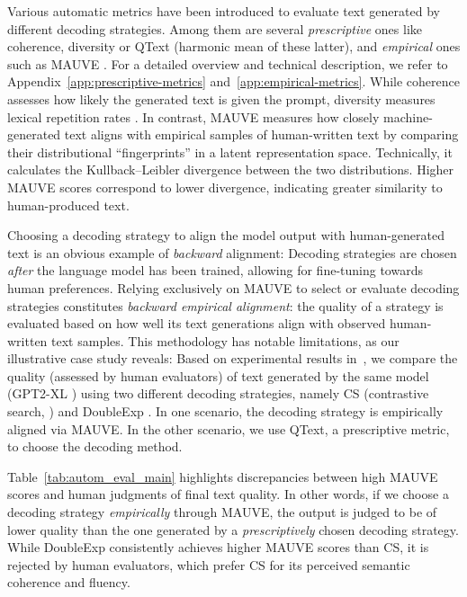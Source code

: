 \documentclass{article}
\theoremstyle{plain}
\theoremstyle{definition}
\theoremstyle{remark}
\begin{document}
Various automatic metrics have been introduced to evaluate text generated by different decoding strategies. Among them are several \textit{prescriptive} ones like coherence, diversity or QText (harmonic mean of these latter), and \textit{empirical} ones such as MAUVE \cite{pillutla2021mauvemeasuringgapneural}. For a detailed overview and technical description, we refer to Appendix~\ref{app:prescriptive-metrics} and~\ref{app:empirical-metrics}. While coherence assesses how likely the generated text is given the prompt, diversity measures lexical repetition rates \cite{su2022empiricalstudycontrastivesearch}.  
In contrast, MAUVE measures how closely machine-generated text aligns with empirical samples of human-written text by comparing their distributional “fingerprints” in a latent representation space. Technically, it calculates the Kullback–Leibler divergence between the two distributions. Higher MAUVE scores correspond to lower divergence, indicating greater similarity to human-produced text.

Choosing a decoding strategy to align the model output with human-generated text is an obvious example of \textit{backward} alignment: Decoding strategies are chosen \textit{after} the language model has been trained, allowing for fine-tuning towards human preferences. Relying exclusively on MAUVE to select or evaluate decoding strategies constitutes \textit{backward empirical alignment}: the quality of a strategy is evaluated based on how well its text generations align with observed human-written text samples. This methodology has notable limitations, as our illustrative case study reveals: Based on experimental results in~\citet{garces-arias-etal-2024-adaptive,garces-arias-etal-2025-decoding}, we compare the quality (assessed by human evaluators) of text generated by the same model (GPT2-XL \cite{radford2019language}) using two different decoding strategies, namely CS (contrastive search, \citet{su2022empiricalstudycontrastivesearch,su2023contrastivesearchneedneural}) and DoubleExp \cite{garces-arias-etal-2024-adaptive}. In one scenario, the decoding strategy is empirically aligned via MAUVE. In the other scenario, we use QText, a prescriptive metric, to choose the decoding method. 

Table~\ref{tab:autom_eval_main} highlights discrepancies between high MAUVE scores and human judgments of final text quality. In other words, if we choose a decoding strategy \textit{empirically} through MAUVE, the output is judged to be of lower quality than the one generated by a \textit{prescriptively} chosen decoding strategy. While DoubleExp consistently achieves higher MAUVE scores than CS, it is rejected by human evaluators, which prefer CS for its perceived semantic coherence and fluency. 
\end{document}
